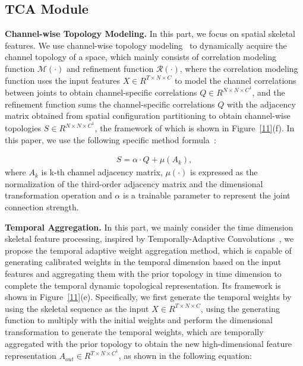 \documentclass[letterpaper]{article} \usepackage[submission]{aaai23}  \usepackage{times}  \usepackage{helvet}  \usepackage{courier}  \usepackage[hyphens]{url}  \usepackage{graphicx} \urlstyle{rm} \def\UrlFont{\rm}  \usepackage{natbib}  \usepackage{caption} \frenchspacing  \setlength{\pdfpagewidth}{8.5in} \setlength{\pdfpageheight}{11in} \usepackage{algorithm}
\begin{document}
\subsection{TCA Module}
\label{sec:B}
\noindent
{\bf Channel-wise Topology Modeling.} In this part, we focus on spatial skeletal features. We use channel-wise topology modeling~\cite{2021Channel} to dynamically acquire the channel topology of a space, which mainly consists of correlation modeling function $\mathcal{M}(\cdot)$ and refinement function $\mathcal{R} (\cdot)$, where the correlation modeling function uses the input features $X \in R^{T \times N\times C}$ to model the channel correlations between joints to obtain channel-specific correlations $Q\in R^{N \times N\times C^{1}}$, and the refinement function sums the channel-specific correlations $Q$ with the adjacency matrix obtained from spatial configuration partitioning to obtain channel-wise topologies $S\in R^{N \times N\times C^{1}}$, the framework of which is shown in Figure~\ref{11}(f). In this paper, we use the following specific method formula~\cite{2021Channel}:

\begin{align}
S=\alpha \cdot Q+  \mu \left ( A_{k}  \right ),
\end{align}
where $A_{k}$ is k-th channel adjacency matrix, $\mu(\cdot)$ is expressed as the normalization of the third-order adjacency matrix and the dimensional transformation operation and $\alpha$ is a trainable parameter to represent the joint connection strength.





\noindent
{\bf Temporal Aggregation.} In this part, we mainly consider the time dimension skeletal feature processing, inspired by Temporally-Adaptive Convolutions~\cite{DBLP:journals/corr/abs-2110-06178}, we propose the temporal adaptive weight aggregation method, which is capable of generating calibrated weights in the temporal dimension based on the input features and aggregating them with the prior topology in time dimension to complete the temporal dynamic topological representation. Its framework is shown in Figure~\ref{11}(e). Specifically, we first generate the temporal weights by using the skeletal sequence as the input $X \in R^{T \times N\times C}$, using the generating function to multiply with the initial weights and perform the dimensional transformation to generate the temporal weights, which are temporally aggregated with the prior topology to obtain the new high-dimensional feature representation $A_{out} \in R^{T \times N\times C^{1}}$, as shown in the following equation:
\end{document}
